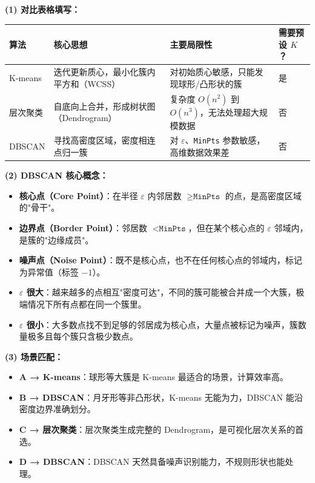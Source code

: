 \documentclass[a4paper,11pt]{ctexart}
\begin{document}
\begin{solutionbox}[参考答案与详细解析]
    \textbf{(1) 对比表格填写：}

    \begin{center}
    \begin{tabular}{p{2.2cm} p{3.8cm} p{3.8cm} p{2.6cm}}
        \toprule
        算法 & 核心思想 & 主要局限性 & 需要预设 $K$？ \\
        \midrule
        K-means & 迭代更新质心，最小化簇内平方和（WCSS） & 对初始质心敏感，只能发现球形/凸形状的簇 & 是 \\[1em]
        层次聚类 & 自底向上合并，形成树状图（Dendrogram） & 复杂度 $O(n^2)$ 到 $O(n^3)$，无法处理超大规模数据 & 否 \\[1em]
        DBSCAN & 寻找高密度区域，密度相连点归一簇 & 对 $\varepsilon$、\texttt{MinPts} 参数敏感，高维数据效果差 & 否 \\
        \bottomrule
    \end{tabular}
    \end{center}

    \textbf{(2) DBSCAN 核心概念：}

    \begin{itemize}
        \item \textbf{核心点（Core Point）}：在半径 $\varepsilon$ 内邻居数 $\geq \texttt{MinPts}$ 的点，是高密度区域的"骨干"。
        \item \textbf{边界点（Border Point）}：邻居数 $< \texttt{MinPts}$，但在某个核心点的 $\varepsilon$ 邻域内，是簇的"边缘成员"。
        \item \textbf{噪声点（Noise Point）}：既不是核心点，也不在任何核心点的邻域内，标记为异常值（标签 $-1$）。
    \end{itemize}

    \begin{itemize}
        \item \textbf{$\varepsilon$ 很大}：越来越多的点相互"密度可达"，不同的簇可能被合并成一个大簇，极端情况下所有点都在同一个簇里。
        \item \textbf{$\varepsilon$ 很小}：大多数点找不到足够的邻居成为核心点，大量点被标记为噪声，簇数量极多且每个簇只含极少数点。
    \end{itemize}

    \textbf{(3) 场景匹配：}
    \begin{itemize}
        \item \textbf{A → K-means}：球形等大簇是 K-means 最适合的场景，计算效率高。
        \item \textbf{B → DBSCAN}：月牙形等非凸形状，K-means 无能为力，DBSCAN 能沿密度边界准确划分。
        \item \textbf{C → 层次聚类}：层次聚类生成完整的 Dendrogram，是可视化层次关系的首选。
        \item \textbf{D → DBSCAN}：DBSCAN 天然具备噪声识别能力，不规则形状也能处理。
    \end{itemize}
\end{solutionbox}
\end{document}
